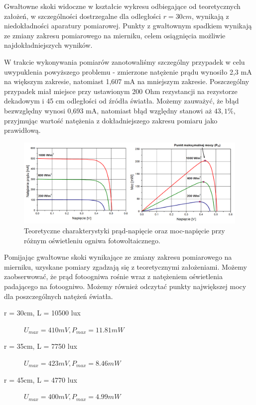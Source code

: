 \documentclass[polish, a4paper]{article}
\begin{document}
Gwałtowne skoki widoczne w kształcie wykresu odbiegające od teoretycznych założeń, w szczególności dostrzegalne dla odległości $r = 30cm$, wynikają z niedokładności aparatury pomiarowej. Punkty z gwałtownym spadkiem wynikają ze zmiany zakresu pomiarowego na mierniku, celem osiągnięcia możliwie najdokładniejszych wyników. 

W trakcie wykonywania pomiarów zanotowaliśmy szczególny przypadek w celu uwypuklenia powyższego problemu - zmierzone natężenie prądu wynosiło 2,3 mA na większym zakresie, natomiast 1,607 mA na mniejszym zakresie. Poszczególny przypadek miał miejsce przy ustawionym 200 Ohm rezystancji na rezystorze dekadowym i 45 cm odległości od źródła światła. Możemy zauważyć, że błąd bezwzględny wynosi 0,693 mA, natomiast błąd względny stanowi aż $43,1 \%$, przyjmując wartość natężenia z dokładniejszego zakresu pomiaru jako prawidłową.

\begin{figure}[H]
\centering
\includegraphics[width=\textwidth]{charakterystyki.png}
\caption{Teoretyczne charakterystyki prąd-napięcie oraz moc-napięcie przy różnym oświetleniu ogniwa fotowoltaicznego.}
\end{figure}

Pomijając gwałtowne skoki wynikające ze zmiany zakresu pomiarowego na mierniku, uzyskane pomiary zgadzają się z teoretycznymi założeniami. Możemy zaobserwować, że prąd fotoogniwa rośnie wraz z natężeniem oświetlenia padającego na fotoogniwo. Możemy również odczytać punkty największej mocy dla poszczególnych natężeń światła.

\begin{description}
    \item[r = 30cm, L = 10500 lux]{$U_{max} = 410 mV, P_{max} = 11.81 mW$}
    \item[r = 35cm, L = 7750 lux]{$U_{max} = 423 mV, P_{max} = 8.46 mW$}
    \item[r = 45cm, L = 4770 lux]{$U_{max} = 400 mV, P_{max} = 4.99 mW$}
\end{description}
\end{document}

